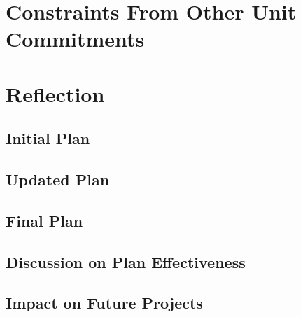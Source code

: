 \section{Constraints From Other Unit Commitments}


\section{Reflection}
\subsection{Initial Plan}

\subsection{Updated Plan}

\subsection{Final Plan}

\subsection{Discussion on Plan Effectiveness}

\subsection{Impact on Future Projects}

